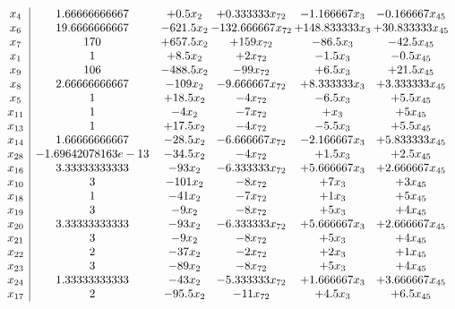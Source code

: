 \documentclass[11pt]{article}
\begin{document}
\[\begin{array}{c| c c@{\hskip 2pt} c@{\hskip 2pt} c@{\hskip 2pt} c@{\hskip 2pt} }
 x_{4}   &  1.66666666667 & + 0.5 x_{2} & + 0.333333 x_{72} & -1.166667 x_{3} & -0.166667 x_{45}\\
 x_{6}   &  19.6666666667 & -621.5 x_{2} & -132.666667 x_{72} & + 148.833333 x_{3} & + 30.833333 x_{45}\\
 x_{7}   &  170 & + 657.5 x_{2} & + 159 x_{72} & -86.5 x_{3} & -42.5 x_{45}\\
 x_{1}   &  1 & + 8.5 x_{2} & + 2 x_{72} & -1.5 x_{3} & -0.5 x_{45}\\
 x_{9}   &  106 & -488.5 x_{2} & -99 x_{72} & + 6.5 x_{3} & + 21.5 x_{45}\\
 x_{8}   &  2.66666666667 & -109 x_{2} & -9.666667 x_{72} & + 8.333333 x_{3} & + 3.333333 x_{45}\\
 x_{5}   &  1 & + 18.5 x_{2} & -4 x_{72} & -6.5 x_{3} & + 5.5 x_{45}\\
 x_{11}   &  1 & -4 x_{2} & -7 x_{72} & +  x_{3} & + 5 x_{45}\\
 x_{13}   &  1 & + 17.5 x_{2} & -4 x_{72} & -5.5 x_{3} & + 5.5 x_{45}\\
 x_{14}   &  1.66666666667 & -28.5 x_{2} & -6.666667 x_{72} & -2.166667 x_{3} & + 5.833333 x_{45}\\
 x_{28}   &  -1.69642078163e-13 & -34.5 x_{2} & -4 x_{72} & + 1.5 x_{3} & + 2.5 x_{45}\\
 x_{16}   &  3.33333333333 & -93 x_{2} & -6.333333 x_{72} & + 5.666667 x_{3} & + 2.666667 x_{45}\\
 x_{10}   &  3 & -101 x_{2} & -8 x_{72} & + 7 x_{3} & + 3 x_{45}\\
 x_{18}   &  1 & -41 x_{2} & -7 x_{72} & + 1 x_{3} & + 5 x_{45}\\
 x_{19}   &  3 & -9 x_{2} & -8 x_{72} & + 5 x_{3} & + 4 x_{45}\\
 x_{20}   &  3.33333333333 & -93 x_{2} & -6.333333 x_{72} & + 5.666667 x_{3} & + 2.666667 x_{45}\\
 x_{21}   &  3 & -9 x_{2} & -8 x_{72} & + 5 x_{3} & + 4 x_{45}\\
 x_{22}   &  2 & -37 x_{2} & -2 x_{72} & + 2 x_{3} & + 1 x_{45}\\
 x_{23}   &  3 & -89 x_{2} & -8 x_{72} & + 5 x_{3} & + 4 x_{45}\\
 x_{24}   &  1.33333333333 & -43 x_{2} & -5.333333 x_{72} & + 1.666667 x_{3} & + 3.666667 x_{45}\\
 x_{17}   &  2 & -95.5 x_{2} & -11 x_{72} & + 4.5 x_{3} & + 6.5 x_{45}\\

\end{array}\]
\end{document}
